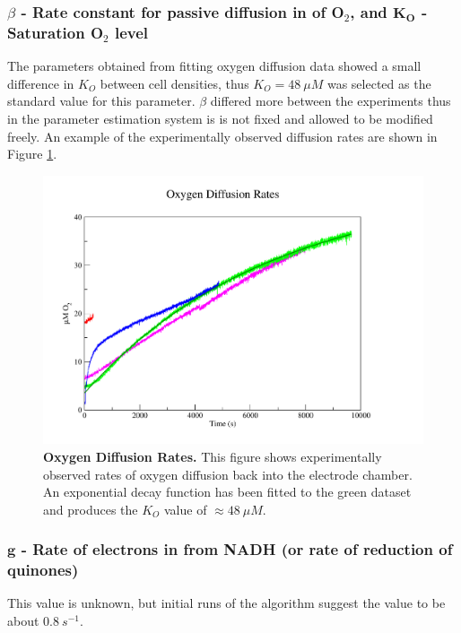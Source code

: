 \subsubsection*{$\beta$ {\bf- Rate constant for passive diffusion in of O$_{\textrm{2}}$}, and $\mathbf{K_O}$ {\bf- Saturation O$_{\textrm{2}}$ level}}
The parameters obtained from fitting oxygen diffusion data showed a small difference in $K_O$ between cell densities, thus $K_O = 48~\mu M$ was selected as the standard value for this parameter. $\beta$ differed more between the experiments thus in the parameter estimation system is is not fixed and allowed to be modified freely. An example of the experimentally observed diffusion rates are shown in Figure \ref{fig:o2rec}.
\begin{figure}[tbp]
 \centering
 \includegraphics[width=14cm, trim=2cm 1cm 4cm 1cm]{./04-model/data/o2rec.pdf}
 \caption[Oxygen Diffusion Rates]{{\bf Oxygen Diffusion Rates.} This figure shows experimentally observed rates of oxygen diffusion back into the electrode chamber. An exponential decay function has been fitted to the green dataset and produces the $K_O$ value of $\approx 48~\mu M$.
 \label{fig:o2rec}}
\end{figure}


\subsubsection*{$\mathbf{g}$ {\bf- Rate of electrons in from NADH (or rate of reduction of quinones)}}
This value is unknown, but initial runs of the algorithm suggest the value to be about $0.8~s^{-1}$.

